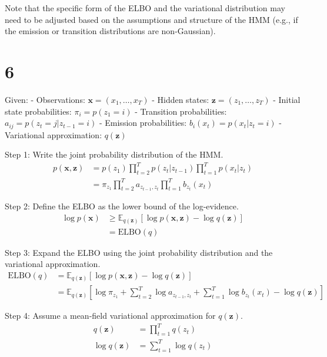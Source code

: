 \documentclass[11pt]{article}
\begin{document}
    Note that the specific form of the ELBO and the variational distribution may need to be adjusted based on the assumptions and structure of the HMM (e.g., if the emission or transition distributions are non-Gaussian).


    \section{6}
    Given:
    - Observations: $\mathbf{x} = (x_1, \ldots, x_T)$
    - Hidden states: $\mathbf{z} = (z_1, \ldots, z_T)$
    - Initial state probabilities: $\pi_i = p(z_1 = i)$
    - Transition probabilities: $a_{ij} = p(z_t = j | z_{t-1} = i)$
    - Emission probabilities: $b_i(x_t) = p(x_t | z_t = i)$
    - Variational approximation: $q(\mathbf{z})$

    Step 1: Write the joint probability distribution of the HMM.
    \begin{align}
        p(\mathbf{x}, \mathbf{z}) &= p(z_1) \prod_{t=2}^T p(z_t | z_{t-1}) \prod_{t=1}^T p(x_t | z_t) \\
        &= \pi_{z_1} \prod_{t=2}^T a_{z_{t-1}, z_t} \prod_{t=1}^T b_{z_t}(x_t)
    \end{align}

    Step 2: Define the ELBO as the lower bound of the log-evidence.
    \begin{align}
        \log p(\mathbf{x}) &\geq \mathbb{E}_{q(\mathbf{z})}[\log p(\mathbf{x}, \mathbf{z}) - \log q(\mathbf{z})] \\
        &= \text{ELBO}(q)
    \end{align}

    Step 3: Expand the ELBO using the joint probability distribution and the variational approximation.
    \begin{align}
        \text{ELBO}(q) &= \mathbb{E}_{q(\mathbf{z})}[\log p(\mathbf{x}, \mathbf{z}) - \log q(\mathbf{z})] \\
        &= \mathbb{E}_{q(\mathbf{z})}[\log \pi_{z_1} + \sum_{t=2}^T \log a_{z_{t-1}, z_t} + \sum_{t=1}^T \log b_{z_t}(x_t) - \log q(\mathbf{z})]
    \end{align}

    Step 4: Assume a mean-field variational approximation for $q(\mathbf{z})$.
    \begin{align}
        q(\mathbf{z}) &= \prod_{t=1}^T q(z_t) \\
        \log q(\mathbf{z}) &= \sum_{t=1}^T \log q(z_t)
    \end{align}
\end{document}
